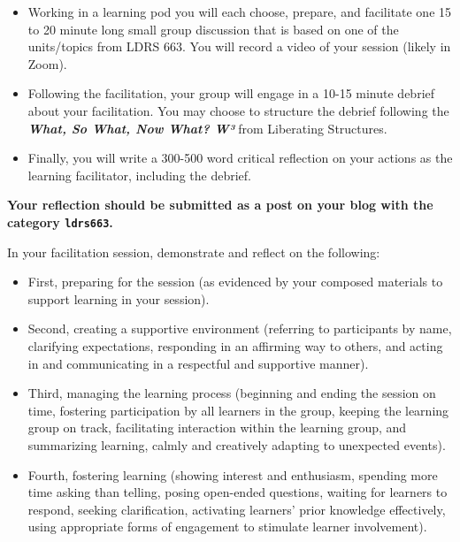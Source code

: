 \documentclass[
]{book}
\providecommand{\tightlist}{%
  \setlength{\itemsep}{0pt}\setlength{\parskip}{0pt}}
\begin{document}
\begin{itemize}
\tightlist
\item
  Working in a learning pod you will each choose, prepare, and facilitate one 15 to 20 minute long small group discussion that is based on one of the units/topics from LDRS 663. You will record a video of your session (likely in Zoom).\\
\item
  Following the facilitation, your group will engage in a 10-15 minute debrief about your facilitation. You may choose to structure the debrief following the \textbf{\emph{What, So What, Now What? W³}} from Liberating Structures.\\
\item
  Finally, you will write a 300-500 word critical reflection on your actions as the learning facilitator, including the debrief.
\end{itemize}

\textbf{Your reflection should be submitted as a post on your blog with the category \texttt{ldrs663}.}

In your facilitation session, demonstrate and reflect on the following:

\begin{itemize}
\tightlist
\item
  First, preparing for the session (as evidenced by your composed materials to support learning in your session).\\
\item
  Second, creating a supportive environment (referring to participants by name, clarifying expectations, responding in an affirming way to others, and acting in and communicating in a respectful and supportive manner).\\
\item
  Third, managing the learning process (beginning and ending the session on time, fostering participation by all learners in the group, keeping the learning group on track, facilitating interaction within the learning group, and summarizing learning, calmly and creatively adapting to unexpected events).\\
\item
  Fourth, fostering learning (showing interest and enthusiasm, spending more time asking than telling, posing open-ended questions, waiting for learners to respond, seeking clarification, activating learners' prior knowledge effectively, using appropriate forms of engagement to stimulate learner involvement).
\end{itemize}
\end{document}
